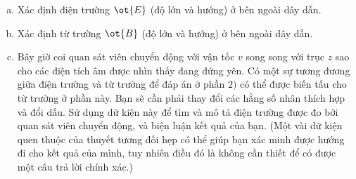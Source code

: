 \begin{vd}
\begin{enumerate}[1)]
    \begin{enumerate}[a)]
        \item Xác định điện trường $\ot{{E}}$ (độ lớn và hướng) ở bên ngoài dây dẫn.
        \item Xác định từ trường $\ot{{B}}$ (độ lớn và hướng) ở bên ngoài dây dẫn.
        \item Bây giờ coi quan sát viên chuyển động với vận tốc $v$ song song với trục $z$ sao cho các điện tích âm được nhìn thấy đang đứng yên. Có một sự tương đương giữa điện trường và từ trường để đáp án ở phần $2)$ có thể được biến tấu cho từ trường ở phần này. Bạn sẽ cần phải thay đổi các hằng số nhân thích hợp và đổi dấu. Sử dụng dữ kiện này để tìm và mô tả điện trường được đo bởi quan sát viên chuyển động, và biện luận kết quả của bạn. (Một vài dữ kiện quen thuộc của thuyết tương đối hẹp có thể giúp bạn xác minh được hướng đi cho kết quả của mình, tuy nhiên điều đó là không cần thiết để có được một câu trả lời chính xác.)
    \end{enumerate}
\end{enumerate}
\end{vd}
